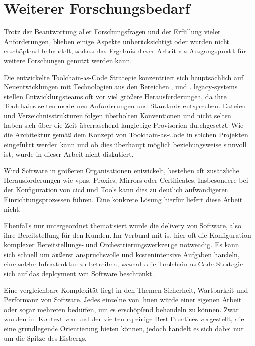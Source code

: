 \section{Weiterer Forschungsbedarf}
\label{sec:07-02_further-research-needs}

Trotz der Beantwortung aller \hyperref[sec:01-03_objectives-and-research-questions]{Forschungsfragen} und der Erfüllung vieler \hyperref[sec:04-03_general-aspects-and-summery-of-findings]{Anforderungen}, blieben einige Aspekte unberücksichtigt oder wurden nicht erschöpfend behandelt, sodass das Ergebnis dieser Arbeit als Ausgangspunkt für weitere Forschungen genutzt werden kann.

Die entwickelte Toolchain-as-Code Strategie konzentriert sich hauptsächlich auf Neuentwicklungen mit Technologien aus den Bereichen ,  und . \Glspl{legacy-system} stellen Entwicklungsteams oft vor viel größere Herausforderungen, da ihre Toolchains selten modernen Anforderungen und Standards entsprechen. Dateien und Verzeichnisstrukturen folgen überholten Konventionen und nicht selten haben sich über die Zeit überraschend langlebige Provisorien durchgesetzt. Wie die Architektur gemäß dem Konzept von Toolchain-as-Code in solchen Projekten eingeführt werden kann und ob dies überhaupt möglich beziehungsweise sinnvoll ist, wurde in dieser Arbeit nicht diskutiert.

Wird Software in größeren Organisationen entwickelt, bestehen oft zusätzliche Herausforderungen wie \Glspl{vpn}, Proxies, Mirrors oder Certificates. Insbesondere bei der Konfiguration von \Gls{cicd} und  Tools kann dies zu deutlich aufwändigeren Einrichtungsprozessen führen. Eine konkrete Lösung hierfür liefert diese Arbeit nicht.

Ebenfalls nur untergeordnet thematisiert wurde die \Gls{delivery} von Software, also ihre Bereitstellung für den Kunden. Im Verbund mit  ist hier oft die Konfiguration komplexer Bereitstellungs- und Orchestrierungswerkzeuge notwendig. Es kann sich schnell um äußerst anspruchsvolle und kostenintensive Aufgaben handeln, eine solche Infrastruktur zu betreiben, weshalb die Toolchain-as-Code Strategie sich auf das \Gls{deployment} von Software beschränkt.

Eine vergleichbare Komplexität liegt in den Themen Sicherheit, Wartbarkeit und Performanz von Software. Jedes einzelne von ihnen würde einer eigenen Arbeit oder sogar mehreren bedürfen, um es erschöpfend behandeln zu können. Zwar wurden im Kontext von  und der vierten \acrlong{rq} einige Best Practices vorgestellt, die eine grundlegende Orientierung bieten können, jedoch handelt es sich dabei nur um die Spitze des Eisbergs.


